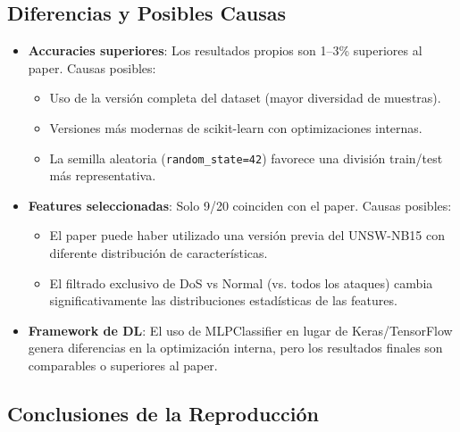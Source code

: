 \documentclass[12pt,a4paper]{article}
\begin{document}
\subsection{Diferencias y Posibles Causas}

\begin{itemize}
    \item \textbf{Accuracies superiores}: Los resultados propios son 1--3\% superiores
          al paper. Causas posibles:
          \begin{itemize}
              \item Uso de la versión completa del dataset (mayor diversidad de muestras).
              \item Versiones más modernas de scikit-learn con optimizaciones internas.
              \item La semilla aleatoria (\texttt{random\_state=42}) favorece una
                    división train/test más representativa.
          \end{itemize}

    \item \textbf{Features seleccionadas}: Solo 9/20 coinciden con el paper.
          Causas posibles:
          \begin{itemize}
              \item El paper puede haber utilizado una versión previa del UNSW-NB15
                    con diferente distribución de características.
              \item El filtrado exclusivo de DoS vs Normal (vs. todos los ataques)
                    cambia significativamente las distribuciones estadísticas de
                    las features.
          \end{itemize}

    \item \textbf{Framework de DL}: El uso de MLPClassifier en lugar de Keras/TensorFlow
          genera diferencias en la optimización interna, pero los resultados finales
          son comparables o superiores al paper.
\end{itemize}

\subsection{Conclusiones de la Reproducción}
\end{document}
